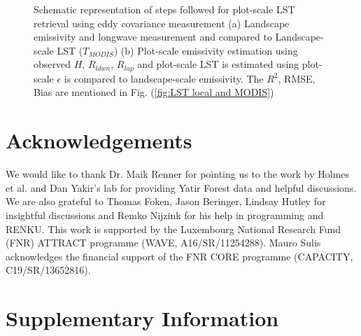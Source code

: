 \documentclass[fleqn,10pt]{wlscirep}
\begin{document}
\begin{figure}[h!]
\begin{subfigure}{.5\textwidth}
{}
\end{subfigure}
\caption{Schematic representation of steps followed for plot-scale LST retrieval using eddy covariance measurement (a) Landscape emissivity and longwave measurement and compared to Landscape-scale LST ($T_{MODIS}$) (b) Plot-scale emissivity estimation using observed $H$, $R_{ldwn}$, $R_{lup}$ and plot-scale LST is estimated using plot-scale $\epsilon$ is compared to landscape-scale emissivity. The $R^{2}$, RMSE, Bias are mentioned in Fig. (\ref{fig:LST local and MODIS})}
\label{fig:flow_chart}
\end{figure}





\section{Acknowledgements}
We would like to thank Dr. Maik Renner for pointing us to the work by Holmes et al. and Dan Yakir's lab for providing Yatir Forest data and helpful discussions. We are also grateful to Thomas Foken, Jason Beringer, Lindsay Hutley for insightful discussions and Remko Nijzink for his help in programming and RENKU. This work is supported by the Luxembourg National Research Fund (FNR) ATTRACT programme (WAVE, A16/SR/11254288). Mauro Sulis acknowledges the financial support of the FNR CORE programme (CAPACITY, C19/SR/13652816).


%



%

\section{Supplementary Information}
\end{document}
